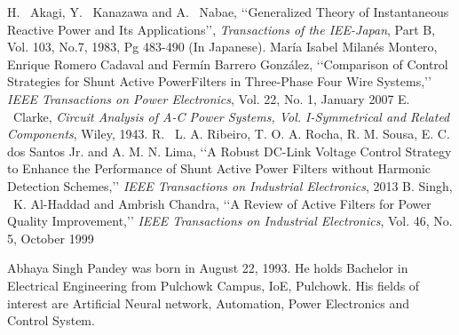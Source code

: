 \documentclass[journal,twoside]{IEEEtran}
\begin{document}
\begin{thebibliography}{9}
        H. ~Akagi, Y. ~Kanazawa and A. ~Nabae, \lq\lq Generalized Theory of Instantaneous Reactive Power and Its Applications\rq\rq,\emph{ Transactions of the IEE-Japan}, Part B, Vol. 103, No.7, 1983, Pg 483-490 (In Japanese).
        Mar\'ia Isabel Milan\'es Montero, Enrique Romero Cadaval and Ferm\'in Barrero Gonz\'alez, \lq\lq Comparison of Control Strategies for Shunt Active PowerFilters in Three-Phase Four Wire Systems,\rq\rq\emph{ IEEE Transactions on Power Electronics}, Vol. 22, No. 1, January 2007
        E. ~Clarke, \emph{Circuit Analysis of A-C Power Systems, Vol. I-Symmetrical and
        Related Components}, Wiley, 1943.
        R. ~L. A. Ribeiro, T. O. A. Rocha, R. M. Sousa, E. C. dos Santos Jr. and A. M. N. Lima, \lq\lq A Robust DC-Link Voltage Control Strategy to Enhance the
        Performance of Shunt Active Power Filters without Harmonic Detection Schemes,\rq\rq \emph{ IEEE Transactions on Industrial Electronics}, 2013
        B. Singh, ~K. Al-Haddad and Ambrish Chandra, \lq\lq A Review of
        Active Filters for Power Quality Improvement,\rq\rq\emph{ IEEE Transactions on
        Industrial Electronics}, Vol. 46, No. 5, October 1999
\end{thebibliography}
\newpage

\begin{IEEEbiography}{Abhaya Singh Pandey} was born in August 22, 1993. He holds Bachelor in Electrical Engineering from Pulchowk Campus, IoE, Pulchowk. His fields of interest are Artificial Neural network, Automation, Power Electronics and Control System.

\end{IEEEbiography}
\end{document}
